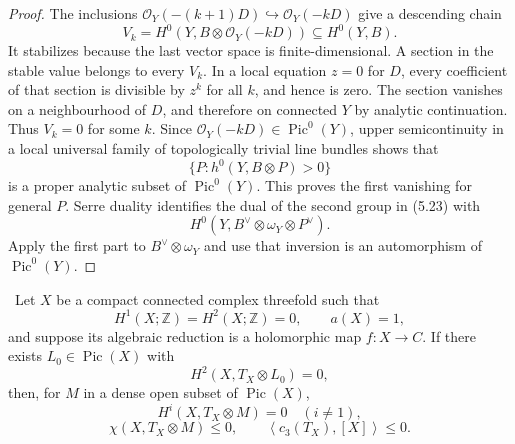 \begin{proof}
The inclusions \(\mathcal O_Y(-(k+1)D)\hookrightarrow
\mathcal O_Y(-kD)\) give a descending chain
\[
 V_k=H^0(Y,B\otimes\mathcal O_Y(-kD))
 \subseteq H^0(Y,B).
\]
It stabilizes because the last vector space is finite-dimensional.  A
section in the stable value belongs to every \(V_k\).  In a local equation
\(z=0\) for \(D\), every coefficient of that section is divisible by
\(z^k\) for all \(k\), and hence is zero.  The section vanishes on a
neighbourhood of \(D\), and therefore on connected \(Y\) by analytic
continuation.  Thus \(V_k=0\) for some \(k\).  Since
\(\mathcal O_Y(-kD)\in\operatorname{Pic}^0(Y)\), upper semicontinuity in a
local universal family of topologically trivial line bundles shows that
\[
 \{P:h^0(Y,B\otimes P)>0\}
\]
is a proper analytic subset of \(\operatorname{Pic}^0(Y)\).  This proves
the first vanishing for general \(P\).  Serre duality identifies the dual
of the second group in (5.23) with
\[
 H^0(Y,B^\vee\otimes\omega_Y\otimes P^\vee).
\]
Apply the first part to \(B^\vee\otimes\omega_Y\) and use that inversion is
an automorphism of \(\operatorname{Pic}^0(Y)\).
\end{proof}

\begin{theorem}
\label{thm:corrected-cdp-global}
\Verified\ Let \(X\) be a compact connected complex threefold such that
\[
 H^1(X;\mathbb Z)=H^2(X;\mathbb Z)=0,\qquad a(X)=1,
\]
and suppose its algebraic reduction is a holomorphic map
\(f:X\to C\).  If there exists \(L_0\in\operatorname{Pic}(X)\) with
\[
 H^2(X,T_X\otimes L_0)=0,
\tag{5.24}
\]
then, for \(M\) in a dense open subset of \(\operatorname{Pic}(X)\),
\[
 H^i(X,T_X\otimes M)=0\quad(i\ne1),
\tag{5.25}
\]
\[
 \chi(X,T_X\otimes M)\le0,\qquad
 \left\langle c_3(T_X),[X]\right\rangle\le0.
\tag{5.26}
\]
\end{theorem}

